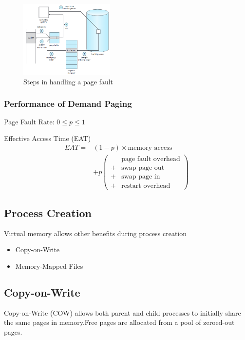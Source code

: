 \begin{figure}[!htb]
    \centering
    \includegraphics[width=0.42\textwidth]{pic/OS9/Steps in handling a page fault}
    \caption{Steps in handling a page fault}
\end{figure}


\subsubsection{Performance of Demand Paging}
Page Fault Rate: $0\le p \le 1$

Effective Access Time (EAT)
\begin{align*}
    EAT =& (1-p)\times \text{memory access}\\
        & + p \left( \begin{array}{rl}
              &\text{page fault overhead}\\
            + &\text{swap page out}\\
            + &\text{swap page in}\\
            + &\text{restart overhead}
        \end{array} \right)
\end{align*}

\subsection*{Process Creation}
Virtual memory allows other benefits during process creation
\begin{itemize}
    \item Copy-on-Write
    \item Memory-Mapped Files
\end{itemize}

\subsection{Copy-on-Write}
Copy-on-Write (COW) allows both parent and child processes to initially share the same pages in memory.Free pages are allocated from a pool of zeroed-out pages. 

